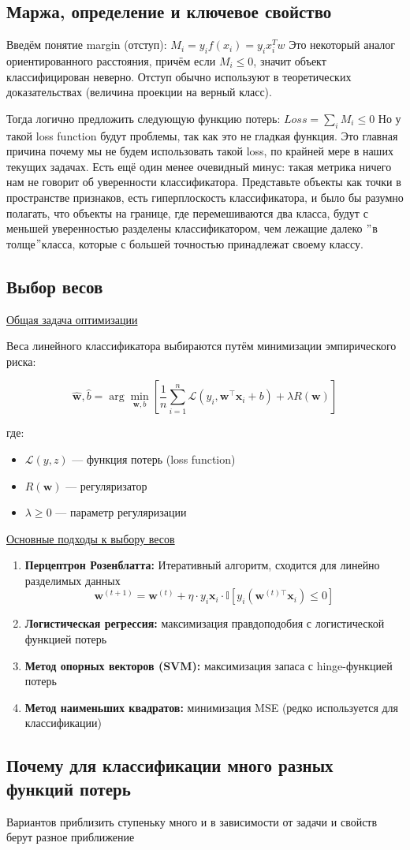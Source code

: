 \subsection{Маржа, определение и ключевое свойство}

Введём понятие margin (отступ): $M_i = y_i f(x_i) = y_i x_i^T w$
Это некоторый аналог ориентированного расстояния, причём если $M_i \leq 0$, значит объект классифицирован неверно.
Отступ обычно используют в теоретических доказательствах (величина проекции на верный класс).

Тогда логично предложить следующую функцию потерь: $Loss = \sum_i M_i \leq 0$
Но у такой loss function будут проблемы, так как это не гладкая функция.
Это главная причина почему мы не будем использовать такой loss, по крайней мере в наших текущих задачах.
Есть ещё один менее очевидный минус: такая метрика ничего нам не говорит об уверенности классификатора.
Представьте объекты как точки в пространстве признаков, есть гиперплоскость классификатора, и было бы разумно
полагать, что объекты на границе, где перемешиваются два класса, будут с меньшей уверенностью разделены
классификатором, чем лежащие далеко \("\)в толще\("\)класса, которые с большей точностью принадлежат своему классу.

\subsection{Выбор весов}

\underline{Общая задача оптимизации}

Веса линейного классификатора выбираются путём минимизации эмпирического риска:

\[ \hat{\bm{w}}, \hat{b} = \arg\min_{\bm{w}, b} \left[ \frac{1}{n} \sum_{i=1}^n \mathcal{L}(y_i, \bm{w}^\top
\bm{x}_i + b) + \lambda R(\bm{w}) \right] \]

где:
\begin{itemize}
    \item $\mathcal{L}(y, z)$ --- функция потерь (loss function)
    \item $R(\bm{w})$ --- регуляризатор
    \item $\lambda \geq 0$ --- параметр регуляризации
\end{itemize}

\underline{Основные подходы к выбору весов}

\begin{enumerate}
    \item \textbf{Перцептрон Розенблатта:} Итеративный алгоритм, сходится для линейно разделимых данных
    \[ \bm{w}^{(t+1)} = \bm{w}^{(t)} + \eta \cdot y_i \bm{x}_i \cdot \mathbb{I}[y_i(\bm{w}^{(t)\top} \bm{x}_i)
    \leq 0] \]
    \item \textbf{Логистическая регрессия:} максимизация правдоподобия с логистической функцией потерь
    \item \textbf{Метод опорных векторов (SVM):} максимизация запаса с hinge-функцией потерь
    \item \textbf{Метод наименьших квадратов:} минимизация MSE (редко используется для классификации)
\end{enumerate}

\subsection{Почему для классификации много разных функций потерь}

Вариантов приблизить ступеньку много и в зависимости от задачи и свойств берут разное приближение